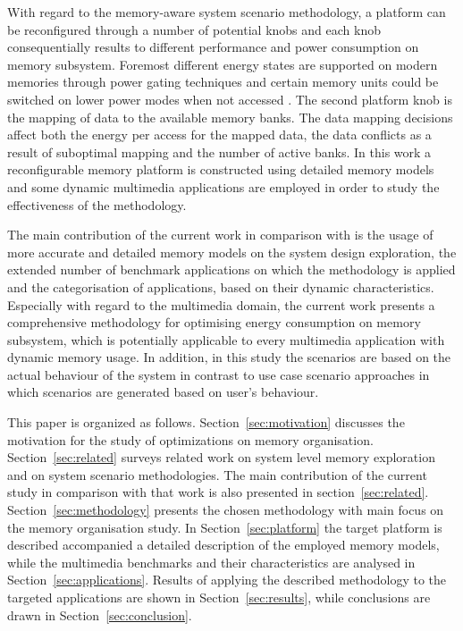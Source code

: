 \documentclass[a4paper,conference]{IEEEtran}
\begin{document}
With regard to the memory-aware system scenario methodology, a platform can be reconfigured through a number of potential knobs and each knob consequentially results to different performance and power consumption on memory subsystem. Foremost different energy states are supported on modern memories through power gating techniques and certain memory units could be switched on lower power modes when not accessed \cite{Fil12}. The second platform knob is the mapping of data to the available memory banks. The data mapping decisions affect both the energy per access for the mapped data, the data conflicts as a result of suboptimal mapping and the number of active banks. In this work a reconfigurable memory platform is constructed using detailed memory models and some dynamic multimedia applications are employed in order to study the effectiveness of the methodology.

The main contribution of the current work in comparison with \cite{Fil12} is the usage of more accurate and detailed memory models on the system design exploration, the extended number of benchmark applications on which the methodology is applied and the categorisation of applications, based on their dynamic characteristics. Especially with regard to the multimedia domain, the current work presents a comprehensive methodology for optimising energy consumption on memory subsystem, which is potentially applicable to every multimedia application with dynamic memory usage. In addition, in this study the scenarios are based on the actual behaviour of the system in contrast to use case scenario approaches in which scenarios are generated based on user's behaviour.

This paper is organized as follows. Section~\ref{sec:motivation} discusses the motivation for the study of optimizations on memory organisation. Section~\ref{sec:related} surveys related work on system level memory exploration and on system scenario methodologies. The main contribution of the current study in comparison with that work is also presented in section~\ref{sec:related}. Section~\ref{sec:methodology} presents the chosen methodology with main focus on the memory organisation study. In Section~\ref{sec:platform} the target platform is described accompanied a detailed description of the employed memory models, while the multimedia benchmarks and their characteristics are analysed in Section~\ref{sec:applications}. Results of applying the described methodology to the targeted applications are shown in Section~\ref{sec:results}, while conclusions are drawn in Section~\ref{sec:conclusion}. 
\end{document}
